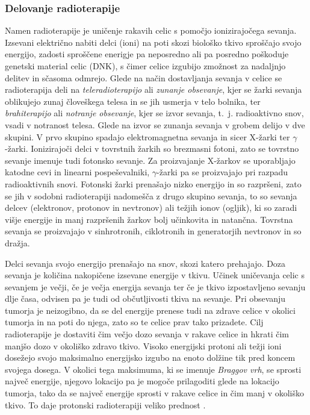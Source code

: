 \documentclass[a4paper,twoside,11pt]{article}
\begin{document}
	\subsubsection*{Delovanje radioterapije}
	\par{
	  Namen radioterapije je uničenje rakavih celic s pomočjo ionizirajočega sevanja. Izsevani električno nabiti delci (ioni) na poti skozi biološko tkivo sproščajo svojo energijo, zadosti sproščene enerigje pa neposredno ali pa posredno poškoduje genetski material celic (DNK), s čimer celice izgubijo zmožnost za nadaljnjo delitev in sčasoma odmrejo. Glede na način dostavljanja sevanja v celice se radioterapija deli na \emph{teleradioterapijo} ali \emph{zunanje obsevanje}, kjer se žarki sevanja oblikujejo zunaj človeškega telesa in se jih usmerja v telo bolnika, ter \emph{brahiterapijo} ali \emph{notranje obsevanje}, kjer se izvor sevanja, t.~j. radioaktivno snov, vsadi v notranost telesa. Glede na izvor se zunanja sevanja v grobem delijo v dve skupini. V prvo skupino spadajo elektromagnetna sevanja in sicer X-žarki ter $\gamma$-žarki. Ionizirajoči delci v tovrstnih žarkih so brezmasni fotoni, zato se tovrstno sevanje imenuje tudi fotonsko sevanje. Za proizvajanje X-žarkov se uporabljajo katodne cevi in linearni pospeševalniki, $\gamma$-žarki pa se proizvajajo pri razpadu radioaktivnih snovi. Fotonski žarki prenašajo nizko energijo in so razpršeni, zato se jih v sodobni radioterapiji nadomešča z drugo skupino sevanja, to so sevanja delcev (elektronov, protonov in nevtronov) ali težjih ionov (ogljik), ki so zaradi višje energije in manj razpršenih žarkov bolj učinkovita in natančna. Tovrstna sevanja se proizvajajo v sinhrotronih, ciklotronih in generatorjih nevtronov in so dražja. \cite{baskar2012}
	}
	\par{
	  Delci sevanja svojo energijo prenašajo na snov, skozi katero prehajajo. Doza sevanja je količina nakopičene izsevane energije v tkivu. Učinek uničevanja celic s sevanjem je večji, če je večja energija sevanja ter če je tkivo izpostavljeno sevanju dlje časa, odvisen pa je tudi od občutljivosti tkiva na sevanje. Pri obsevanju tumorja je neizogibno, da se del energije prenese tudi na zdrave celice v okolici tumorja in na poti do njega, zato so te celice prav tako prizadete. Cilj radioterapije je dostaviti čim večjo dozo sevanja v rakave celice in hkrati čim manjšo dozo v okoliško zdravo tkivo. Visoko energijski protoni ali težji ioni dosežejo svojo maksimalno energijsko izgubo na enoto dolžine tik pred koncem svojega dosega. V okolici tega maksimuma, ki se imenuje \emph{Braggov vrh}, se sprosti največ energije, njegovo lokacijo pa je mogoče prilagoditi glede na lokacijo tumorja, tako da se največ energije sprosti v rakave celice in čim manj v okoliško tkivo. To daje protonski radioterapiji veliko prednost \cite{gregoire2015}.
	}
\end{document}

